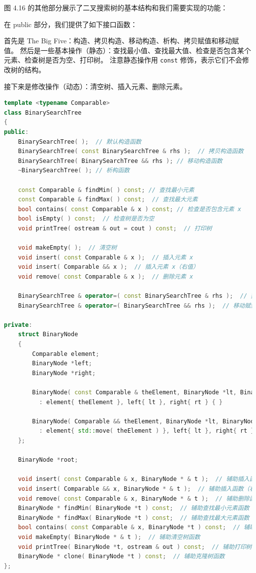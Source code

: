 \documentclass[a4paper]{ctexart}
\theoremstyle{definition}
\theoremstyle{definition}
\begin{document}
图 4.16 的其他部分展示了二叉搜索树的基本结构和我们需要实现的功能：

在 public 部分，我们提供了如下接口函数：

首先是 The Big Five：构造、拷贝构造、移动构造、析构、拷贝赋值和移动赋值。
然后是一些基本操作（静态）：查找最小值、查找最大值、检查是否包含某个元素、检查树是否为空、打印树。
注意静态操作用 \verb|const| 修饰，表示它们不会修改树的结构。

接下来是修改操作（动态）：清空树、插入元素、删除元素。

\begin{lstlisting}[language=c++]
template <typename Comparable>
class BinarySearchTree
{
public:
    BinarySearchTree( );  // 默认构造函数
    BinarySearchTree( const BinarySearchTree & rhs );  // 拷贝构造函数
    BinarySearchTree( BinarySearchTree && rhs ); // 移动构造函数
    ~BinarySearchTree( ); // 析构函数

    const Comparable & findMin( ) const; // 查找最小元素
    const Comparable & findMax( ) const;  // 查找最大元素
    bool contains( const Comparable & x ) const; // 检查是否包含元素 x
    bool isEmpty( ) const;  // 检查树是否为空
    void printTree( ostream & out = cout ) const;  // 打印树

    void makeEmpty( );  // 清空树
    void insert( const Comparable & x );  // 插入元素 x
    void insert( Comparable && x );  // 插入元素 x（右值）
    void remove( const Comparable & x );  // 删除元素 x

    BinarySearchTree & operator=( const BinarySearchTree & rhs );  // 拷贝赋值运算符
    BinarySearchTree & operator=( BinarySearchTree && rhs );  // 移动赋值运算符

private:
    struct BinaryNode
    {
        Comparable element;
        BinaryNode *left;
        BinaryNode *right;

        BinaryNode( const Comparable & theElement, BinaryNode *lt, BinaryNode *rt )
          : element{ theElement }, left{ lt }, right{ rt } { }

        BinaryNode( Comparable && theElement, BinaryNode *lt, BinaryNode *rt )
          : element{ std::move( theElement ) }, left{ lt }, right{ rt } { }
    };

    BinaryNode *root;

    void insert( const Comparable & x, BinaryNode * & t );  // 辅助插入函数
    void insert( Comparable && x, BinaryNode * & t );  // 辅助插入函数（右值）
    void remove( const Comparable & x, BinaryNode * & t );  // 辅助删除函数
    BinaryNode * findMin( BinaryNode *t ) const;  // 辅助查找最小元素函数
    BinaryNode * findMax( BinaryNode *t ) const;  // 辅助查找最大元素函数
    bool contains( const Comparable & x, BinaryNode *t ) const;  // 辅助检查包含元素函数
    void makeEmpty( BinaryNode * & t );  // 辅助清空树函数
    void printTree( BinaryNode *t, ostream & out ) const;  // 辅助打印树函数
    BinaryNode * clone( BinaryNode *t ) const;  // 辅助克隆树函数
};
\end{lstlisting}
\end{document}
